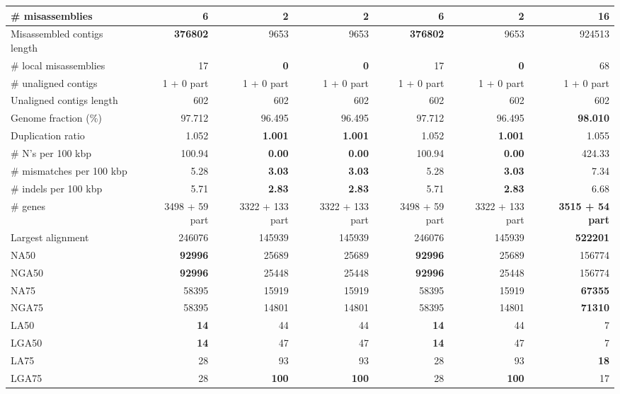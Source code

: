 \documentclass[12pt,a4paper]{article}
\begin{document}
\begin{table}[ht]
\begin{center}
\begin{tabular}{|l*{6}{|r}|}
\# misassemblies & 6 & 2 & 2 & 6 & 2 & {\bf 16} \\ \hline
Misassembled contigs length & {\bf 376802} & 9653 & 9653 & {\bf 376802} & 9653 & 924513 \\ \hline
\# local misassemblies & 17 & {\bf 0} & {\bf 0} & 17 & {\bf 0} & 68 \\ \hline
\# unaligned contigs & 1 + 0 part & 1 + 0 part & 1 + 0 part & 1 + 0 part & 1 + 0 part & 1 + 0 part \\ \hline
Unaligned contigs length & 602 & 602 & 602 & 602 & 602 & 602 \\ \hline
Genome fraction (\%) & 97.712 & 96.495 & 96.495 & 97.712 & 96.495 & {\bf 98.010} \\ \hline
Duplication ratio & 1.052 & {\bf 1.001} & {\bf 1.001} & 1.052 & {\bf 1.001} & 1.055 \\ \hline
\# N's per 100 kbp & 100.94 & {\bf 0.00} & {\bf 0.00} & 100.94 & {\bf 0.00} & 424.33 \\ \hline
\# mismatches per 100 kbp & 5.28 & {\bf 3.03} & {\bf 3.03} & 5.28 & {\bf 3.03} & 7.34 \\ \hline
\# indels per 100 kbp & 5.71 & {\bf 2.83} & {\bf 2.83} & 5.71 & {\bf 2.83} & 6.68 \\ \hline
\# genes & 3498 + 59 part & 3322 + 133 part & 3322 + 133 part & 3498 + 59 part & 3322 + 133 part & {\bf 3515 + 54 part} \\ \hline
Largest alignment & 246076 & 145939 & 145939 & 246076 & 145939 & {\bf 522201} \\ \hline
NA50 & {\bf 92996} & 25689 & 25689 & {\bf 92996} & 25689 & 156774 \\ \hline
NGA50 & {\bf 92996} & 25448 & 25448 & {\bf 92996} & 25448 & 156774 \\ \hline
NA75 & 58395 & 15919 & 15919 & 58395 & 15919 & {\bf 67355} \\ \hline
NGA75 & 58395 & 14801 & 14801 & 58395 & 14801 & {\bf 71310} \\ \hline
LA50 & {\bf 14} & 44 & 44 & {\bf 14} & 44 & 7 \\ \hline
LGA50 & {\bf 14} & 47 & 47 & {\bf 14} & 47 & 7 \\ \hline
LA75 & 28 & 93 & 93 & 28 & 93 & {\bf 18} \\ \hline
LGA75 & 28 & {\bf 100} & {\bf 100} & 28 & {\bf 100} & 17 \\ \hline
\end{tabular}
\end{center}
\end{table}
\end{document}
